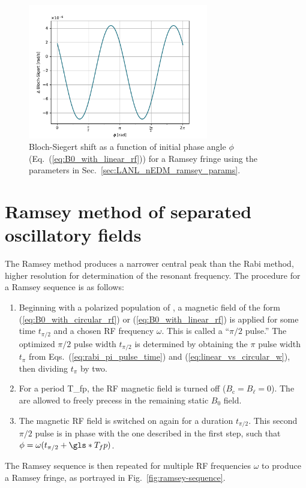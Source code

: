 \begin{figure}
    \centering
    \includegraphics[width=0.7\textwidth]{figures/bloch-siegert-lanl-params.pdf}
    \caption
    {Bloch-Siegert shift as a function of initial phase angle $\phi$ (Eq.~(\ref{eq:B0_with_linear_rf})) for a Ramsey fringe using the parameters in Sec.~\ref{sec:LANL_nEDM_ramsey_params}.}
    \label{fig:bloch-siegert-phase}
\end{figure}



\section{Ramsey method of separated oscillatory fields\label{sec:ramsey-method}}


The Ramsey method produces a narrower central peak than the Rabi method, higher resolution for determination of the resonant frequency. The procedure for a Ramsey sequence is as follows:
%
\begin{enumerate}
    \item Beginning with a polarized population of \ucn, a magnetic field of the form (\ref{eq:B0_with_circular_rf}) or (\ref{eq:B0_with_linear_rf}) is applied for some time $t_{\pi/2}$ and a chosen RF frequency $\omega$. This is called a ``$\pi/2$ pulse.'' The optimized $\pi/2$ pulse width $t_{\pi/2}$ is determined by obtaining the $\pi$ pulse width $t_\pi$ from Eqs.~(\ref{eq:rabi_pi_pulse_time}) and (\ref{eq:linear_vs_circular_w}), then dividing $t_\pi$ by two.
    \item For a period \gls{T_fp}, the RF magnetic field is turned off ($B_\text{c}=B_\ell=0$). The \ucn are allowed to freely precess in the remaining static $B_0$ field.
    \item The magnetic RF field is switched on again for a duration $t_{\pi/2}$. This second $\pi/2$ pulse is in phase with the one described in the first step, such that $\phi = \omega ( t_{\pi/2} + \gls*{T_fp})$.
\end{enumerate}
%
The Ramsey sequence is then repeated for multiple RF frequencies $\omega$ to produce a Ramsey fringe, as portrayed in Fig.~\ref{fig:ramsey-sequence}. 

